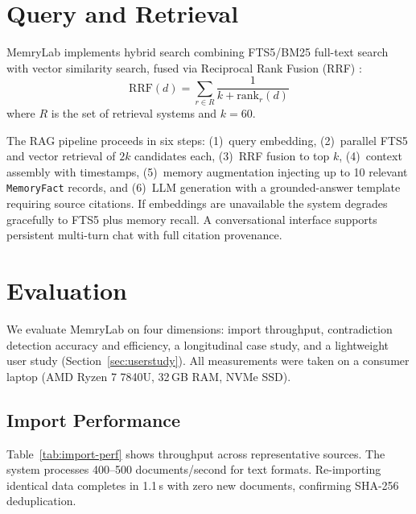 \documentclass[pdflatex,sn-mathphys-num]{sn-jnl}
\begin{document}
\section{Query and Retrieval}\label{sec:query}

MemryLab implements hybrid search combining FTS5/BM25 full-text search \cite{sqlite2023fts5,robertson2009bm25} with vector similarity search, fused via Reciprocal Rank Fusion (RRF) \cite{cormack2009rrf}:
\begin{equation}
\text{RRF}(d) = \sum_{r \in R} \frac{1}{k + \text{rank}_r(d)}
\label{eq:rrf}
\end{equation}
where $R$ is the set of retrieval systems and $k{=}60$.

The RAG pipeline proceeds in six steps: (1)~query embedding, (2)~parallel FTS5 and vector retrieval of $2k$ candidates each, (3)~RRF fusion to top $k$, (4)~context assembly with timestamps, (5)~memory augmentation injecting up to 10 relevant \texttt{MemoryFact} records, and (6)~LLM generation with a grounded-answer template requiring source citations. If embeddings are unavailable the system degrades gracefully to FTS5 plus memory recall. A conversational interface supports persistent multi-turn chat with full citation provenance.

\section{Evaluation}\label{sec:evaluation}

We evaluate MemryLab on four dimensions: import throughput, contradiction detection accuracy and efficiency, a longitudinal case study, and a lightweight user study (Section~\ref{sec:userstudy}). All measurements were taken on a consumer laptop (AMD Ryzen 7 7840U, 32\,GB RAM, NVMe SSD).

\subsection{Import Performance}

Table~\ref{tab:import-perf} shows throughput across representative sources. The system processes 400--500 documents/second for text formats. Re-importing identical data completes in 1.1\,s with zero new documents, confirming SHA-256 deduplication.
\end{document}
